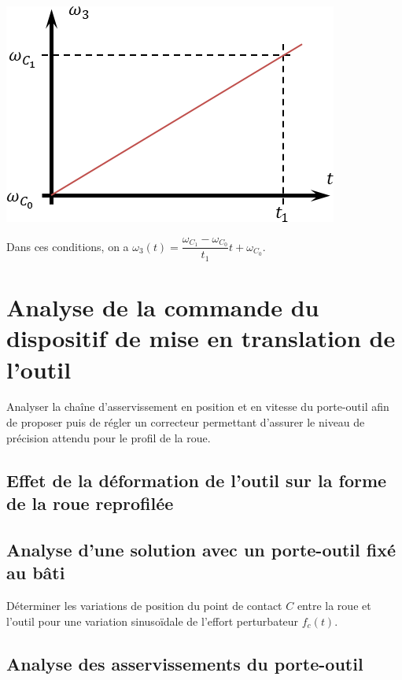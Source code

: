 \documentclass[10pt,fleqn]{article} %
\begin{document}
 \begin{center}
\includegraphics[width=.5\linewidth]{images/fig_05}
\end{center}

Dans ces conditions, on a $\omega_3(t)=\dfrac{\omega_{C_1}-\omega_{C_0}}{t_1}t+\omega_{C_0}$.

\subparagraph{}

\subparagraph{}
\subparagraph{}
\subparagraph{}
\subparagraph{}



\section{Analyse de la commande du dispositif de mise en translation de l’outil}
\begin{obj}
Analyser la chaîne d’asservissement en position et en vitesse du porte-outil afin de proposer puis de régler un correcteur permettant d’assurer le niveau de précision attendu pour le profil de la roue.
\end{obj}

\subsection{Effet de la déformation de l’outil sur la forme de la roue reprofilée}

\subsection{Analyse d’une solution avec un porte-outil fixé au bâti}
\begin{obj}
Déterminer les variations de position du point de contact $C$ entre la roue et l’outil pour une variation
sinusoïdale de l’effort perturbateur $f_c(t)$.
\end{obj}

\subparagraph{}
\subsection{Analyse des asservissements du porte-outil}
\end{document}
